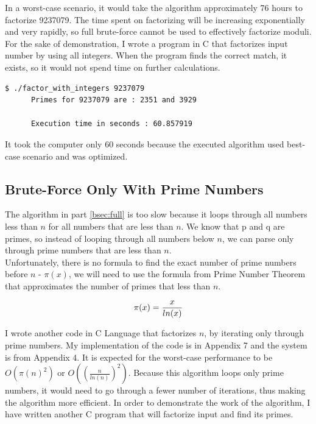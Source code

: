 \documentclass[a4paper, 12pt]{article}
\begin{document}
In a worst-case scenario, it would take the algorithm approximately 76 hours to factorize 9237079. The time spent on factorizing
will be increasing exponentially and very rapidly, so full brute-force cannot be used to effectively factorize
moduli.\\

For the sake of demonstration, I wrote a program in C that factorizes input number by using all integers. When the program
finds the correct match, it exists, so it would not spend time on further calculations.\cite{github}

\begin{center}
\begin{lstlisting}[caption=Demonstration of Prime Factorization with Integers]
      $ ./factor_with_integers 9237079            
      Primes for 9237079 are : 2351 and 3929

      Execution time in seconds : 60.857919
  \end{lstlisting}
\end{center}

It took the computer only 60 seconds because the executed algorithm used best-case scenario and was optimized.\cite{github}

\subsection{Brute-Force Only With Prime Numbers}
\label{bsec:primes}

The algorithm in part \ref{bsec:full} is too slow because it loops through all numbers less than $n$ for all
numbers that are less than $n$. We know that p and q are primes, so instead of looping through all
numbers below $n$, we can parse only through prime numbers that are less than $n$.\\
Unfortunately, there is no formula to find the exact number of prime numbers before $n$ - $\pi(x)$, we will need to use
the formula from Prime Number Theorem that approximates the number of primes that less than $n$\cite{pi}.

\begin{equation}
  \pi(x)=\frac{x}{ln(x)}\\
  \end{equation}

I wrote another code in C\cite{Clang} Language that factorizes $n$, by iterating only through prime
numbers. My implementation of the code is in Appendix 7 and the system is from Appendix 4.
It is expected for the worst-case performance to be $O(\pi(n)^2)$ or $O((\frac{n}{ln(n)})^2)$.
Because this algorithm loops only prime
numbers, it would need to go through a fewer number of iterations, thus making the algorithm more efficient.
In order to demonstrate the work of the algorithm, I have written another C program that will factorize
input and find its primes.\\
\end{document}
